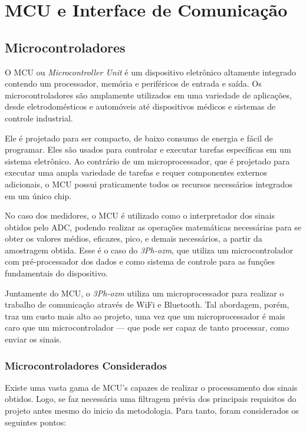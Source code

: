 \section{MCU e Interface de Comunicação}\label{sec:MCUInterface}

\subsection{Microcontroladores}\label{subsec:MCU}

O \gls{MCU} ou \textit{Microcontroller Unit} é um dispositivo eletrônico altamente integrado contendo um processador, memória e periféricos de entrada e saída. Os microcontroladores são amplamente utilizados em uma variedade de aplicações, desde eletrodomésticos e automóveis até dispositivos médicos e sistemas de controle industrial.

Ele é projetado para ser compacto, de baixo consumo de energia e fácil de programar. Eles são usados para controlar e executar tarefas específicas em um sistema eletrônico. Ao contrário de um microprocessador, que é projetado para executar uma ampla variedade de tarefas e requer componentes externos adicionais, o \gls{MCU} possui praticamente todos os recursos necessários integrados em um único chip.

No caso dos medidores, o \gls{MCU} é utilizado como o interpretador dos sinais obtidos pelo \gls{ADC}, podendo realizar as operações matemáticas necessárias para se obter os valores médios, eficazes, pico, e demais necessários, a partir da amostragem obtida. Esse é o caso do \textit{3Ph-ozm}, que utiliza um microcontrolador com pré-processador dos dados e como sistema de controle para as funções fundamentais do dispositivo. \cite{3ph-ozm}

Juntamente do \gls{MCU}, o \textit{3Ph-ozm} utiliza um microprocessador para realizar o trabalho de comunicação através de WiFi e Bluetooth.
Tal abordagem, porém, traz um custo mais alto ao projeto, uma vez que um microprocessador é mais caro que um microcontrolador --- que pode ser capaz de tanto processar, como enviar os sinais. \cite{uCdiff}

\subsubsection{Microcontroladores Considerados} \label{subsubsec:uc-disp}

Existe uma vasta gama de \gls{MCU}'s capazes de realizar o processamento dos sinais obtidos. Logo, se faz necessária uma filtragem prévia dos principais requisitos do projeto antes mesmo do inicio da metodologia.
Para tanto, foram considerados os seguintes pontos:

